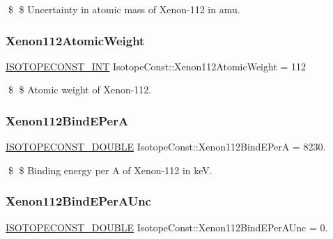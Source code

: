 \$ \$ Uncertainty in atomic mass of Xenon-\/112 in amu. \mbox{\label{group___isotope_const-_xenon-_xe112_gaed75e3168fba8cd39fdfcdd7ec6d9797}} 
\subsubsection{\texorpdfstring{Xenon112\+Atomic\+Weight}{Xenon112AtomicWeight}}
{\footnotesize\ttfamily \mbox{\hyperlink{group___isotope_const-_macros_ga5f18360b3e99483a35c32d789e62621c}{I\+S\+O\+T\+O\+P\+E\+C\+O\+N\+S\+T\+\_\+\+I\+NT}} Isotope\+Const\+::\+Xenon112\+Atomic\+Weight = 112}

\$ \$ Atomic weight of Xenon-\/112. \mbox{\label{group___isotope_const-_xenon-_xe112_gab5a6e2aa5ef7f7050afdffd789e57589}} 
\subsubsection{\texorpdfstring{Xenon112\+Bind\+E\+PerA}{Xenon112BindEPerA}}
{\footnotesize\ttfamily \mbox{\hyperlink{group___isotope_const-_macros_ga8f45a7272ce02c0b4c65c44636ed719a}{I\+S\+O\+T\+O\+P\+E\+C\+O\+N\+S\+T\+\_\+\+D\+O\+U\+B\+LE}} Isotope\+Const\+::\+Xenon112\+Bind\+E\+PerA = 8230.}

\$ \$ Binding energy per A of Xenon-\/112 in keV. \mbox{\label{group___isotope_const-_xenon-_xe112_ga5a7033620c5d50ceb0cc1d0730c17537}} 
\subsubsection{\texorpdfstring{Xenon112\+Bind\+E\+Per\+A\+Unc}{Xenon112BindEPerAUnc}}
{\footnotesize\ttfamily \mbox{\hyperlink{group___isotope_const-_macros_ga8f45a7272ce02c0b4c65c44636ed719a}{I\+S\+O\+T\+O\+P\+E\+C\+O\+N\+S\+T\+\_\+\+D\+O\+U\+B\+LE}} Isotope\+Const\+::\+Xenon112\+Bind\+E\+Per\+A\+Unc = 0.}

